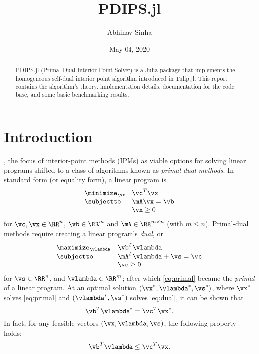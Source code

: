 \documentclass[titlepage]{abhi-tufte-handout}
\title{PDIPS.jl}
\date{May 04, 2020}
\author{Abhinav Sinha}
\begin{document}
\maketitle

\tableofcontents

\newpage

\begin{abstract}
\noindent
PDIPS.jl (Primal-Dual Interior-Point Solver) is a Julia package that implements
the homogeneous self-dual interior point algorithm introduced
in Tulip.jl.\cite{Tulip.jl}
This report contains the algorithm's theory, implementation details,
documentation for the code base, and some basic benchmarking results.
\end{abstract}

\section{Introduction}\label{sec:introduction}
, the focus of interior-point methods
(IPMs) as viable options for solving linear programs shifted to a class of
algorithms known as \textit{primal-dual methods}.\cite{Wright1997}
In standard form (or equality form), a linear program is
\begin{equation}\label{eq:primal}
\begin{array}{ll}
    \displaystyle\minimize_{\vx} & \vc^T\vx \\
    \subjectto & \mA\vx = \vb \\
               & \vx \ge 0 \\
\end{array}
\end{equation}
for \(\vc, \vx \in \RR^n\), \(\vb \in \RR^m\) and \(\mA \in \RR^{m \times n}\)
(with \(m \leq n\)).
Primal-dual methods require creating a linear program's \textit{dual}, or
\begin{equation}\label{eq:dual}
\begin{array}{ll}
    \displaystyle\maximize_{\vlambda} & \vb^T \vlambda \\
    \subjectto & \mA^T \vlambda + \vs = \vc \\
               & \vs \ge 0 \\
\end{array}
\end{equation}
for \(\vs \in \RR^n\), and \(\vlambda \in \RR^m\);
after which \eqref{eq:primal} became the \textit{primal} of a linear program.
At an optimal solution \((\vx^*, \vlambda^*, \vs^*)\), where \(\vx^*\) solves
\eqref{eq:primal} and \((\vlambda^*, \vs^*)\) solves \eqref{eq:dual}, it can be
shown that
\[ \vb^T \vlambda^* = \vc^T\vx^*. \]
In fact, for any feasible vectors \((\vx, \vlambda, \vs)\), the
following property holds:
\[ \vb^T \vlambda \leq \vc^T \vx.\]
\end{document}
